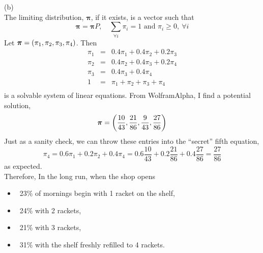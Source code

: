 \documentclass[a4paper,12pt]{report}
\begin{document}
\sol(b) \\
The limiting distribution, $\boldsymbol{\pi}$, if it exists, is a vector such that 
$$
    \boldsymbol{\pi} = \boldsymbol{\pi}P,\quad \sum_{\forall i}\pi_i = 1 \text{ and } \pi_i\geq 0,\ \forall i
$$
Let $\boldsymbol{\pi} = \left( \pi_1, \pi_2, \pi_3, \pi_4 \right)$. Then
$$
    \begin{array}{lcl}
         \pi_1 &=& 0.4\pi_1 + 0.4\pi_2 + 0.2\pi_3   \\
         \pi_2 &=& 0.4\pi_2 + 0.4\pi_3 + 0.2\pi_4   \\
         \pi_3 &=& 0.4\pi_3 + 0.4\pi_4    \\
         1 &=& \pi_1 + \pi_2 + \pi_3 + \pi_4   \\
    \end{array}
$$
is a solvable system of linear equations. From WolframAlpha, I find a potential solution,
$$
    \boldsymbol{\pi} = \left( \frac{10}{43}, \frac{21}{86}, \frac{9}{43}, \frac{27}{86} \right)
$$
Just as a sanity check, we can throw these entries into the ``secret'' fifth equation,
$$
    \pi_4 = 0.6\pi_1 + 0.2\pi_2 + 0.4\pi_4 = 0.6\frac{10}{43} + 0.2\frac{21}{86} + 0.4\frac{27}{86} = \frac{27}{86}
$$
as expected. \\
Therefore, In the long run, when the shop opens
\begin{itemize}
    \item ~23\% of mornings begin with 1 racket on the shelf,
    \item ~24\% with 2 rackets,
    \item ~21\% with 3 rackets,
    \item ~31\% with the shelf freshly refilled to 4 rackets.
\end{itemize}
\end{document}
